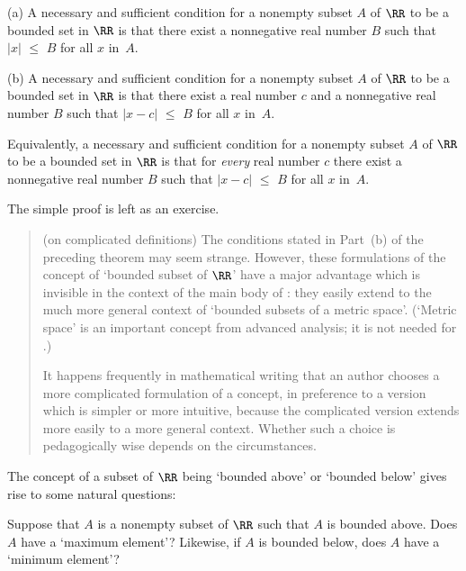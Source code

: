 \hspace*{\parindent} (a) A necessary and sufficient condition for a nonempty subset $A$ of ${\RR}$ to be a bounded set in ${\RR}$
    is that there exist a nonnegative real number $B$ such that $|x|\,\,{\leq}\,\,B$ for all $x$ in~$A$.

\V

        (b) A necessary and sufficient condition for a nonempty subset $A$ of ${\RR}$ to be a bounded set in ${\RR}$
    is that there exist a real number $c$ and a nonnegative real number $B$ such that $|x-c|\,\,{\leq}\,\,B$ for all $x$ in~$A$.

        Equivalently, a necessary and sufficient condition for a nonempty subset $A$ of ${\RR}$ to be a bounded set in ${\RR}$
    is that for {\em every} real number $c$ there exist a nonnegative real number $B$ such that $|x-c|\,\,{\leq}\,\,B$ for all $x$ in~$A$.

\V

        The simple proof is left as an exercise. %

\V

\begin{quotation}
{\footnotesize \underline{\Note} (on complicated definitions) The conditions stated in Part~(b) of the preceding theorem may seem strange.
    However, these formulations of the concept of `bounded subset of ${\RR}$' have a major advantage which is invisible in the context of the main body of {\ThisText}:
    they easily extend to the much more general context of `bounded subsets of a metric space'.
    (`Metric space' is an important concept from advanced analysis; it is not needed for {\ThisText}.)

        It happens frequently in mathematical writing that an author chooses a more complicated formulation of a concept,
    in preference to a version which is simpler or more intuitive, because the complicated version extends more easily to a more general context.
    Whether such a choice is pedagogically wise depends on the circumstances.
}%
\end{quotation}

\VV

        The concept of a subset of ${\RR}$ being `bounded above' or `bounded below' gives rise to some natural questions:

        Suppose that $A$ is a nonempty subset of ${\RR}$ such that $A$ is bounded above.
    Does $A$ have a `maximum element'? Likewise, if $A$ is bounded below, does $A$ have a `minimum element'?

